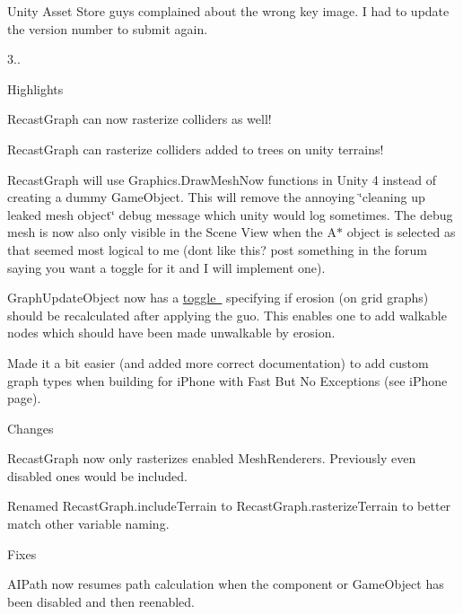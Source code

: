 \begin{DoxyItemize}
\begin{DoxyItemize}
\item Unity Asset Store guys complained about the wrong key image. I had to update the version number to submit again.
\end{DoxyItemize}
\item 3..
\begin{DoxyItemize}
\item Highlights
\begin{DoxyItemize}
\item Recast\+Graph can now rasterize colliders as well!
\item Recast\+Graph can rasterize colliders added to trees on unity terrains!
\item Recast\+Graph will use Graphics.\+Draw\+Mesh\+Now functions in Unity 4 instead of creating a dummy Game\+Object. This will remove the annoying \char`\"{}cleaning up leaked mesh object\char`\"{} debug message which unity would log sometimes. The debug mesh is now also only visible in the Scene View when the A$\ast$ object is selected as that seemed most logical to me (don\textquotesingle{}t like this? post something in the forum saying you want a toggle for it and I will implement one).
\item Graph\+Update\+Object now has a \mbox{\hyperlink{class_pathfinding_1_1_graph_update_object_a3bdfb340802e0f334777ff6e29c7aeba}{toggle }} specifying if erosion (on grid graphs) should be recalculated after applying the guo. This enables one to add walkable nodes which should have been made unwalkable by erosion.
\item Made it a bit easier (and added more correct documentation) to add custom graph types when building for i\+Phone with Fast But No Exceptions (see i\+Phone page).
\end{DoxyItemize}
\item Changes
\begin{DoxyItemize}
\item Recast\+Graph now only rasterizes enabled Mesh\+Renderers. Previously even disabled ones would be included.
\item Renamed Recast\+Graph.\+include\+Terrain to Recast\+Graph.\+rasterize\+Terrain to better match other variable naming.
\end{DoxyItemize}
\item Fixes
\begin{DoxyItemize}
\item A\+I\+Path now resumes path calculation when the component or Game\+Object has been disabled and then reenabled.

\end{DoxyItemize}
\end{DoxyItemize}
\end{DoxyItemize}
